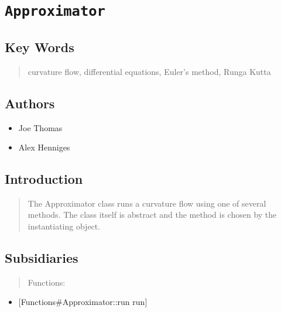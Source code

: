                       


\section*{\texttt{Approximator}}

\label{f0}

\subsection*{Key Words}

\begin{quotation}
curvature flow, differential equations, Euler's method, Runga Kutta
\end{quotation}

\subsection*{Authors}

\begin{itemize}
\item Joe Thomas

\item Alex Henniges
\end{itemize}

\subsection*{Introduction}

\begin{quotation}
The Approximator class runs a curvature flow using one of several methods.
The class itself is abstract and the method is chosen by the instantiating
object.
\end{quotation}

\subsection*{Subsidiaries}

\begin{quotation}
Functions:
\end{quotation}

\begin{itemize}
\item \mbox{$[$}Functions\#Approximator::run run\mbox{$]$}
\end{itemize}


